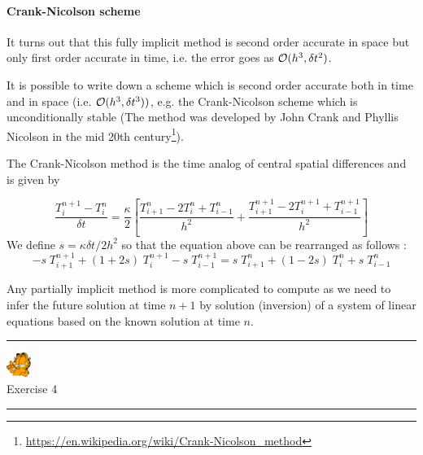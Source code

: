 \paragraph{Crank-Nicolson scheme} 
It turns out that this fully implicit method is second order accurate in space but 
only first order accurate in time,
i.e. the error goes as ${\cal O}(h^3,\delta t^2)$.   


It is possible to write down a scheme which is second order accurate both in time and in space
(i.e. ${\cal O}(h^3, \delta t^3))$, e.g. the {\color{olive}Crank-Nicolson} scheme 
which is unconditionally stable (The method was developed by John Crank and Phyllis Nicolson 
in the mid 20th century\footnote{\url{https://en.wikipedia.org/wiki/Crank-Nicolson_method}}).

The Crank-Nicolson method is the time analog of central spatial differences and is given by

\[
\frac{T_{i}^{n+1}-T_i^n}{\delta t} 
= \frac{\kappa}{2} \left[
\frac{T_{i+1}^{n} - 2T_i^{n} + T_{i-1}^{n}}{h^2}
+
\frac{T_{i+1}^{n+1} - 2T_i^{n+1} + T_{i-1}^{n+1}}{h^2}
\right]
\]
We define $s=\kappa \delta t/ 2h^2$ so that the equation above can be rearranged as follows :
\[
\boxed{
-s\; T_{i+1}^{n+1} + (1+2s)\;  T_{i}^{n+1} 
-s\;  T_{i-1}^{n+1} = 
s\; T_{i+1}^{n} + (1-2s)\; T_{i}^{n} + s\; T_{i-1}^{n} 
}
\]

Any partially implicit method is more complicated to compute as we need to infer the future solution 
at time $n+1$ by solution (inversion) of a system of linear equations based on the known solution at time $n$. 

\begin{center}

\end{center}


\begin{center}
\begin{minipage}[t]{0.77\textwidth}
\par\noindent\rule{\textwidth}{0.4pt}

\begin{center}
\includegraphics[width=0.8cm]{images/garftr} \\
{\color{orange}Exercise 4}
\end{center}

\par\noindent\rule{\textwidth}{0.4pt}
\end{minipage}
\end{center}





